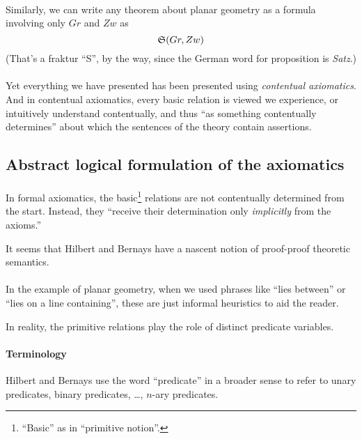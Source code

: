 \paragraph{}
Similarly, we can write any theorem about planar geometry as a formula
involving only $Gr$ and $Zw$ as
\begin{equation*}
\mathfrak{S}(Gr,Zw)
\end{equation*}
(That's a fraktur ``S'', by the way, since the German word for
proposition is \textit{Satz\/}.)

\paragraph{}
Yet everything we have presented has been presented using
\emph{contentual axiomatics}. And in contentual axiomatics, every
basic relation is viewed we experience, or intuitively understand
contentually, and thus ``as something contentually determines'' about
which the sentences of the theory contain assertions.

\subsection{Abstract logical formulation of the axiomatics}

\paragraph{}
In formal axiomatics, the basic\footnote{``Basic'' as in ``primitive notion''.} relations
are not contentually determined from the start.
Instead, they ``receive their determination only \emph{implicitly} from
the axioms.''

It seems that Hilbert and Bernays have a nascent notion of proof-proof
theoretic semantics.

\paragraph{}
In the example of planar geometry, when we used phrases like ``lies between''
or ``lies on a line containing'', these are just informal heuristics
to aid the reader.

In reality, the primitive relations play the role of distinct
predicate variables.

\paragraph{Terminology}
Hilbert and Bernays use the word ``predicate'' in a broader sense to
refer to unary predicates, binary predicates, \dots, $n$-ary predicates.

